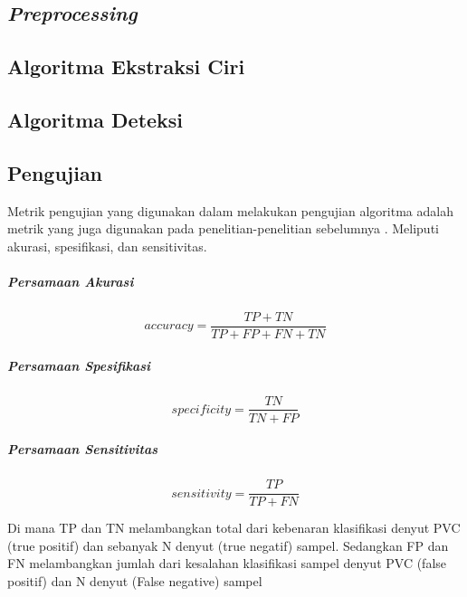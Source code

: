 \subsection{\textit{Preprocessing}}

\subsection{Algoritma Ekstraksi Ciri}	

\subsection{Algoritma Deteksi}

\subsection{Pengujian}
Metrik pengujian yang digunakan dalam melakukan pengujian algoritma adalah metrik yang juga digunakan pada penelitian-penelitian sebelumnya \cite{Karpagachelvi2010,yasinKaya}. Meliputi akurasi, spesifikasi, dan sensitivitas.

\subparagraph {Persamaan Akurasi}
\begin{equation}\label{akurasi}
accuracy = \frac{TP + TN}{TP+FP+FN+TN}
\end{equation}

\subparagraph {Persamaan Spesifikasi}
\begin{equation}\label{spesifikasi}
specificity = \frac{TN}{TN+FP}
\end{equation}

\subparagraph {Persamaan Sensitivitas}
\begin{equation}\label{sensitivitas}
sensitivity = \frac{TP}{TP+FN}
\end{equation}

Di mana TP dan TN melambangkan total dari kebenaran klasifikasi denyut PVC (true positif) dan sebanyak N denyut (true negatif) sampel. Sedangkan FP dan FN melambangkan jumlah dari kesalahan klasifikasi sampel denyut PVC (false positif) dan N denyut (False negative) sampel\cite{yasinKaya}
